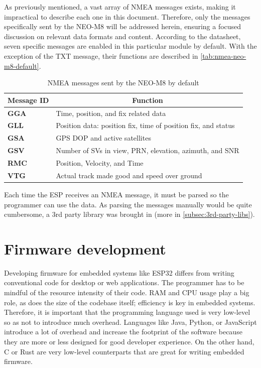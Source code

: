 \documentclass[FM,BP,EN,fonts]{tulthesis}
\begin{document}
As previously mentioned, a vast array of NMEA messages exists, making it impractical to describe each one in this document. Therefore, only the messages specifically sent by the NEO-M8 will be addressed herein, ensuring a focused discussion on relevant data formats and content. According to the datasheet, seven specific messages are enabled in this particular module by default. With the exception of the TXT message, their functions are described in \autoref{tab:nmea-neo-m8-default}.

\begin{table}[ht]
    \centering
    \begin{tabular}{|l|l|}
        \hline
        \multicolumn{1}{|c|}{Message ID} & \multicolumn{1}{c|}{Function}                                 \\ \hline
        \textbf{GGA}                     & Time, position, and fix related data                          \\ \hline
        \textbf{GLL}                     & Position data: position fix, time of position fix, and status \\ \hline
        \textbf{GSA}                     & GPS DOP and active satellites                                 \\ \hline
        \textbf{GSV}                     & Number of SVs in view, PRN, elevation, azimuth, and SNR       \\ \hline
        \textbf{RMC}                     & Position, Velocity, and Time                                  \\ \hline
        \textbf{VTG}                     & Actual track made good and speed over ground                  \\ \hline
    \end{tabular}
    \caption{NMEA messages sent by the NEO-M8 by default}
    \label{tab:nmea-neo-m8-default}
\end{table}

Each time the ESP receives an NMEA message, it must be parsed so the programmer can use the data. As parsing the messages manually would be quite cumbersome, a 3rd party library was brought in (more in \autoref{subsec:3rd-party-libs}).

\section{Firmware development}
Developing firmware for embedded systems like ESP32 differs from writing conventional code for desktop or web applications. The programmer has to be mindful of the resource intensity of their code. RAM and CPU usage play a big role, as does the size of the codebase itself; efficiency is key in embedded systems. Therefore, it is important that the programming language used is very low-level so as not to introduce much overhead. Languages like Java, Python, or JavaScript introduce a lot of overhead and increase the footprint of the software because they are more or less designed for good developer experience. On the other hand, C or Rust are very low-level counterparts that are great for writing embedded firmware. 
\end{document}
